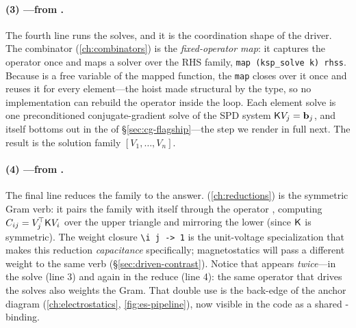 \paragraph{(3) ---from .} The
fourth line runs the solves, and it is the coordination shape of the driver. The
 combinator (\cref{ch:combinators}) is the \emph{fixed-operator
map}: it captures the operator  once and maps a solver over the RHS family,
\lstinline[style=l4style]|map (ksp_solve k) rhss|. Because  is a free
variable of the mapped function, the \texttt{map} closes over it once and reuses it
for every element---the hoist made structural by the type, so no implementation can
rebuild the operator inside the loop. Each element solve  is
one preconditioned conjugate-gradient solve of the SPD system $\mathsf{K} V_j=\mathbf{b}_j$, and
 itself bottoms out in the  of
\S\ref{sec:cg-flagship}---the step we render in full next. The result  is
the solution family $[V_1,\dots,V_n]$.

\paragraph{(4) ---from
.} The final line reduces the family to the answer.
 (\cref{ch:reductions}) is the symmetric Gram verb: it pairs the
family with itself through the operator , computing
$C_{ij}=V_j^{\!\top}\mathsf{K} V_i$ over the upper triangle and mirroring the lower (since
$\mathsf{K}$ is symmetric). The weight closure \lstinline[style=l4style]|\i j -> 1| is the
unit-voltage specialization that makes this reduction \emph{capacitance}
specifically; magnetostatics will pass a different weight to the same verb
(\S\ref{sec:driven-contrast}). Notice that  appears \emph{twice}---in the
solve (line 3) and again in the reduce (line 4): the same operator that drives the
solves also weights the Gram. That double use is the back-edge of the anchor diagram
(\cref{ch:electrostatics}, \cref{fig:es-pipeline}), now visible in the code as a
shared -binding.

